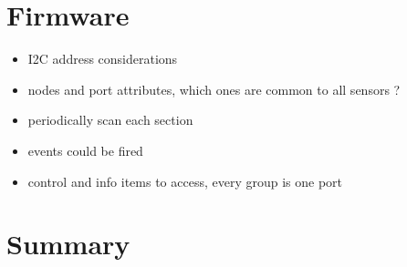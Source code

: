 \section{Firmware}

\begin{itemize}
\item I2C address considerations
\item nodes and port attributes, which ones are common to all sensors ?
\item periodically scan each section
\item events could be fired
\item control and info items to access, every group is one port
\end{itemize}

\section{Summary}

